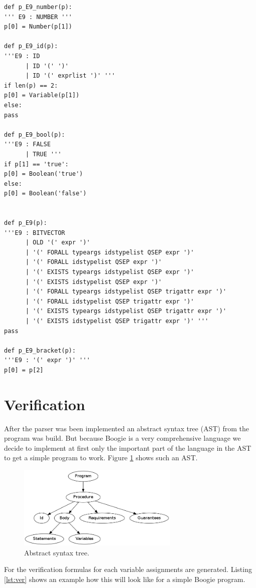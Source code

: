 \documentclass[paper=a4, fontsize=12pt]{scrartcl}
\begin{document}
\begin{lstlisting}[caption=Boogie program example, label=lst:e9]
def p_E9_number(p):
''' E9 : NUMBER '''
p[0] = Number(p[1])

def p_E9_id(p):
'''E9 : ID
      | ID '(' ')'
      | ID '(' exprlist ')' '''
if len(p) == 2:
p[0] = Variable(p[1])
else:
pass 

def p_E9_bool(p):
'''E9 : FALSE
      | TRUE '''
if p[1] == 'true':
p[0] = Boolean('true')
else:
p[0] = Boolean('false')	


def p_E9(p):
'''E9 : BITVECTOR
      | OLD '(' expr ')'
      | '(' FORALL typeargs idstypelist QSEP expr ')'
      | '(' FORALL idstypelist QSEP expr ')'
      | '(' EXISTS typeargs idstypelist QSEP expr ')'
      | '(' EXISTS idstypelist QSEP expr ')'
      | '(' FORALL typeargs idstypelist QSEP trigattr expr ')'
      | '(' FORALL idstypelist QSEP trigattr expr ')'
      | '(' EXISTS typeargs idstypelist QSEP trigattr expr ')'
      | '(' EXISTS idstypelist QSEP trigattr expr ')' '''
pass

def p_E9_bracket(p):
'''E9 : '(' expr ')' '''
p[0] = p[2]
\end{lstlisting}

\section{Verification}
After the parser was been implemented an abstract syntax tree (AST) from the program was build. But because Boogie is a very comprehensive language we decide to implement at first only the important part of the language in the AST to get a simple program to work. Figure \ref{fig:ast} shows such an AST.

\begin{figure}[ht]
  \centering
    \includegraphics[height=4cm]{ast}
    \caption{Abstract syntax tree.}
  \label{fig:ast}
\end{figure}

For the verification formulas for each variable assignments are generated. Listing \ref{lst:ver} shows an example how this will look like for a simple Boogie program.
  
\end{document}
